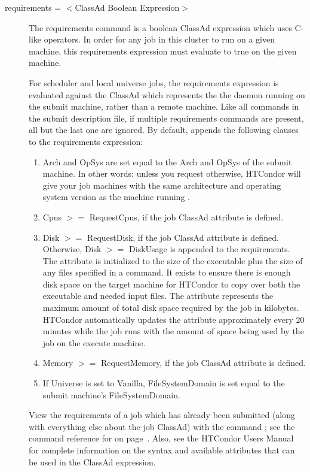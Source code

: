 \begin{description}
\label{man-condor-submit-requirements}
\item[requirements = $<$ClassAd Boolean Expression$>$]
The requirements
command is a boolean ClassAd expression which uses C-like operators. In
order for any job in this cluster to run on a given machine, this
requirements expression must evaluate to true on the given machine. 


For scheduler and local universe jobs, the requirements expression is
evaluated against
the  ClassAd which represents the 
the  daemon running on the submit machine,
rather than a remote machine.
Like all commands in the submit description file, if multiple requirements
commands are present, all but the last one are ignored.
By default,  appends the following clauses to
the requirements expression:
\begin{enumerate}
        \item Arch and OpSys are set equal to the Arch and OpSys of the
submit machine.  In other words: unless you request otherwise, 
HTCondor will give your
job machines with the same architecture and operating system version as
the machine running .
        \item Cpus $>=$ RequestCpus, if the job ClassAd attribute
 is defined.
        \item Disk $>=$ RequestDisk, if the job ClassAd attribute
 is defined.
Otherwise, Disk $>=$ DiskUsage is appended to the requirements.
The  attribute is initialized to the size of the
executable plus the size of any files specified in a
 command.
It exists to ensure there is enough disk space on the
target machine for HTCondor to copy over both the executable
and needed input files.
The  attribute represents the maximum amount of
total disk space required by the job in kilobytes.
HTCondor automatically updates the  attribute
approximately every 20 minutes while the job runs with the
amount of space being used by the job on the execute machine.
        \item Memory $>=$ RequestMemory, if the job ClassAd attribute
 is defined.
        \item If Universe is set to Vanilla, FileSystemDomain is set equal to
the submit machine's FileSystemDomain.
\end{enumerate}
View the requirements of a job
which has already been submitted (along with everything else about the
job ClassAd) with the command ; see the command reference for
 on page~\pageref{man-condor-q}.  Also, see the HTCondor Users
Manual for complete information on the syntax and available attributes
that can be used in the ClassAd expression.


\end{description} 


